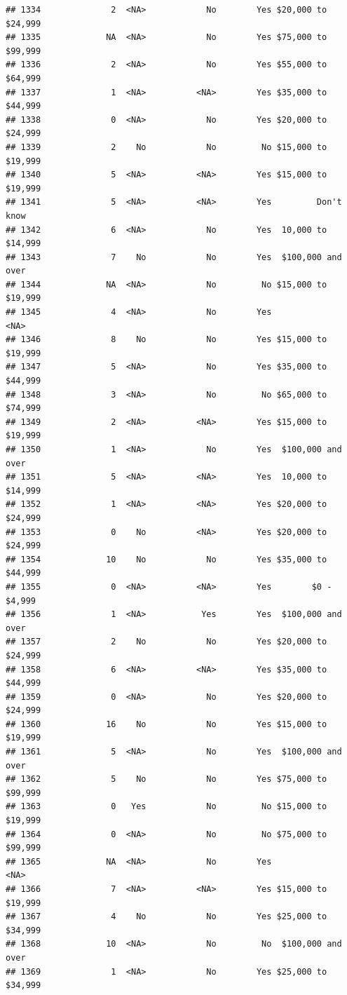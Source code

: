 \documentclass[man]{apa6}
\begin{document}
\begin{verbatim}
## 1334              2  <NA>            No        Yes $20,000 to $24,999
## 1335             NA  <NA>            No        Yes $75,000 to $99,999
## 1336              2  <NA>            No        Yes $55,000 to $64,999
## 1337              1  <NA>          <NA>        Yes $35,000 to $44,999
## 1338              0  <NA>            No        Yes $20,000 to $24,999
## 1339              2    No            No         No $15,000 to $19,999
## 1340              5  <NA>          <NA>        Yes $15,000 to $19,999
## 1341              5  <NA>          <NA>        Yes         Don't know
## 1342              6  <NA>            No        Yes  10,000 to $14,999
## 1343              7    No            No        Yes  $100,000 and over
## 1344             NA  <NA>            No         No $15,000 to $19,999
## 1345              4  <NA>            No        Yes               <NA>
## 1346              8    No            No        Yes $15,000 to $19,999
## 1347              5  <NA>            No        Yes $35,000 to $44,999
## 1348              3  <NA>            No         No $65,000 to $74,999
## 1349              2  <NA>          <NA>        Yes $15,000 to $19,999
## 1350              1  <NA>            No        Yes  $100,000 and over
## 1351              5  <NA>          <NA>        Yes  10,000 to $14,999
## 1352              1  <NA>          <NA>        Yes $20,000 to $24,999
## 1353              0    No          <NA>        Yes $20,000 to $24,999
## 1354             10    No            No        Yes $35,000 to $44,999
## 1355              0  <NA>          <NA>        Yes        $0 - $4,999
## 1356              1  <NA>           Yes        Yes  $100,000 and over
## 1357              2    No            No        Yes $20,000 to $24,999
## 1358              6  <NA>          <NA>        Yes $35,000 to $44,999
## 1359              0  <NA>            No        Yes $20,000 to $24,999
## 1360             16    No            No        Yes $15,000 to $19,999
## 1361              5  <NA>            No        Yes  $100,000 and over
## 1362              5    No            No        Yes $75,000 to $99,999
## 1363              0   Yes            No         No $15,000 to $19,999
## 1364              0  <NA>            No         No $75,000 to $99,999
## 1365             NA  <NA>            No        Yes               <NA>
## 1366              7  <NA>          <NA>        Yes $15,000 to $19,999
## 1367              4    No            No        Yes $25,000 to $34,999
## 1368             10  <NA>            No         No  $100,000 and over
## 1369              1  <NA>            No        Yes $25,000 to $34,999

\end{verbatim}
\end{document}
